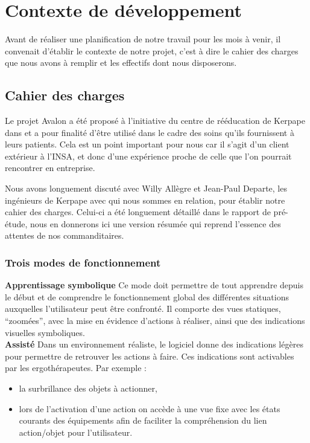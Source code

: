 \section{Contexte de développement}

Avant de réaliser une planification de notre travail pour les mois à venir, il convenait d'établir le contexte de notre projet, c'est à dire le cahier des charges que nous avons à remplir et  les effectifs dont nous disposerons.

\subsection{Cahier des charges}

Le projet Avalon a été proposé à l'initiative du centre de rééducation de Kerpape dans et a pour finalité d'être utilisé dans le cadre des soins qu'ils fournissent à leurs patients. Cela est un point important pour nous car il s'agit d'un client extérieur à l'INSA, et donc d'une expérience proche de celle que l'on pourrait rencontrer en entreprise. \newline

Nous avons longuement discuté avec Willy Allègre et Jean-Paul Departe, les ingénieurs de Kerpape avec qui nous sommes en relation, pour établir notre cahier des charges. Celui-ci a été longuement détaillé dans le rapport de pré-étude, nous en donnerons ici une version résumée qui reprend l'essence des attentes de nos commanditaires. 

\subsubsection{Trois modes de fonctionnement}

\textbf{Apprentissage symbolique}
\newline
Ce mode doit permettre de tout apprendre depuis le début et de comprendre le fonctionnement global des différentes situations auxquelles l'utilisateur peut être confronté. Il comporte des vues statiques, \enquote{zoomées}, avec la mise en évidence d'actions à réaliser, ainsi que des indications visuelles symboliques.\\

\textbf{Assisté}
\newline
Dans un environnement réaliste, le logiciel donne des indications légères pour permettre de retrouver les actions à faire. Ces indications sont activables par les ergothérapeutes. Par exemple :
\begin{itemize}
  \item la surbrillance des objets à actionner,
  \item lors de l'activation d'une action on accède à une vue fixe avec les états courants des équipements afin de faciliter la compréhension du lien action/objet pour l'utilisateur. \\
\end{itemize}

